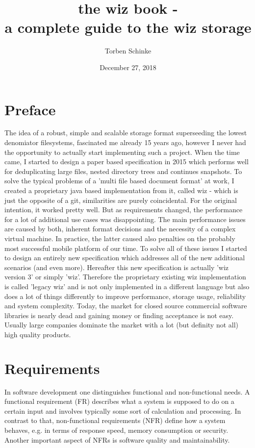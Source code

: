 \documentclass[9pt,pagesize,DIV12,normalheadings,BCOR5mm,headexclude,footexclude]{scrbook}
\title{the wiz book -\\a complete guide to the wiz storage}
\date{December 27, 2018}
\author{Torben Schinke}
\begin{document}
\maketitle
\tableofcontents

\chapter{Preface}
The idea of a robust, simple and scalable storage format superseeding the 
lowest denomiator filesystems, fascinated me already 15 years ago, 
however I never had the opportunity to actually start implementing such a 
project. 
When the time came, I started to design a paper based specification in 2015 
which 
performs well for deduplicating large files, nested directory trees and 
continues snapshots. To solve the typical problems of a 'multi file based 
document format' at work, I created a proprietary java based implementation 
from it, called wiz - which is just the opposite of a git, similarities are 
purely coincidental. For the original intention, it worked pretty well. 
But as requirements changed, the performance for a lot of additional use 
cases was disappointing. The main performance issues are caused by both, 
inherent format decisions and the necessity of a complex virtual machine. 
In practice, the latter caused also penalties on the probably most successful 
mobile platform of our time. To solve all of these issues I started to design 
an entirely new specification which addresses all of the new additional 
scenarios (and even more). Hereafter this new specification is actually 
'wiz version 3' or simply 'wiz'. Therefore the proprietary existing wiz 
implementation is called 'legacy wiz' and is not only implemented in a 
different language but also does a lot of things differently to improve 
performance, storage usage, reliability and system complexity. 
Today, the market for closed source commercial software libraries is nearly 
dead and gaining money or finding acceptance is not easy. 
Usually large companies dominate the market with a lot (but definity not all) 
high quality products.

\chapter{Requirements}
In software development one distinguishes functional and non-functional 
needs. A functional requirement (FR) describes what a system is supposed to 
do on a certain input and involves typically some sort of calculation and 
processing. In contrast to that, non-functional requirements (NFR) define 
how a system behaves, e.g. in terms of response speed, memory consumption 
or security. Another important aspect of NFRs is software quality and 
maintainability. 
\end{document}
